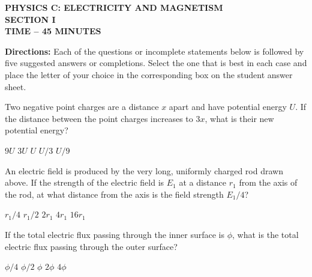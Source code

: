 \documentclass[12pt]{../../oss-apphys-exam}
\begin{document}
\begin{center}
  {
    \Large
    \textbf{PHYSICS C: ELECTRICITY AND MAGNETISM\\
      SECTION I\\
      TIME -- 45 MINUTES
    }
  }
\end{center}

\textbf{Directions:} Each of the questions or incomplete statements below is
followed by five suggested answers or completions. Select the one that is best
in each case and place the letter of your choice in the corresponding box on
the student answer sheet.

\begin{questions}
  \question Two negative point charges are a distance $x$ apart and have
  potential energy $U$. If the distance between the point charges increases to
  $3x$, what is their new potential energy?
  \begin{choices}
    \choice $9U$
    \choice $3U$
    \choice $U$
    \choice $U/3$
    \choice $U/9$
  \end{choices}
  \newpage
  
  \question An electric field is produced by the very long, uniformly charged
  rod drawn above. If the strength of the electric field is $E_1$ at a distance
  $r_1$ from the axis of the rod, at what distance from the axis is
  the field strength $E_1/4$?
  \begin{choices}
    \choice $r_1/4$
    \choice $r_1/2$
    \choice $2r_1$
    \choice $4r_1$
    \choice $16r_1$
  \end{choices}
  \newpage
  

  \question If the total electric flux passing through the inner surface is
  $\phi$, what is the total electric flux passing through the outer surface?
  \begin{choices}
    \choice $\phi/4$
    \choice $\phi/2$
    \choice $\phi$
    \choice $2\phi$
    \choice $4\phi$
  \end{choices}
  \label{sphere1}
  

\end{questions}
\end{document}
